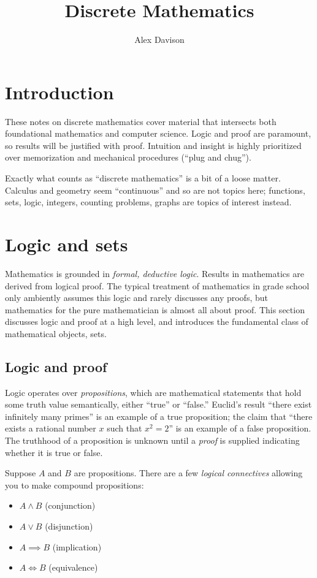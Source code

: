 \documentclass[11pt]{article}
\title{\textbf{Discrete Mathematics}}
\author{Alex Davison}
\theoremstyle{definition}
\theoremstyle{remark}
\begin{document}
\maketitle

\tableofcontents

\section{Introduction}

These notes on discrete mathematics cover material that intersects both foundational mathematics and computer science. Logic and proof are paramount, so results will be justified with proof. Intuition and insight is highly prioritized over memorization and mechanical procedures (``plug and chug'').

Exactly what counts as ``discrete mathematics'' is a bit of a loose matter. Calculus and geometry seem ``continuous'' and so are not topics here; functions, sets, logic, integers, counting problems, graphs are topics of interest instead.

\section{Logic and sets}

Mathematics is grounded in \emph{formal, deductive logic}. Results in mathematics are derived from logical proof. The typical treatment of mathematics in grade school only ambiently assumes this logic and rarely discusses any proofs, but mathematics for the pure mathematician is almost all about proof. This section discusses logic and proof at a high level, and introduces the fundamental class of mathematical objects, sets.

\subsection{Logic and proof}

Logic operates over \emph{propositions}, which are mathematical statements that hold some truth value semantically, either ``true'' or ``false.'' Euclid's result ``there exist infinitely many primes'' is an example of a true proposition; the claim that ``there exists a rational number $x$ such that $x^2 = 2$'' is an example of a false proposition. The truthhood of a proposition is unknown until a \emph{proof} is supplied indicating whether it is true or false.

Suppose $A$ and $B$ are propositions. There are a few \emph{logical connectives} allowing you to make compound propositions:
\begin{itemize}
    \item $A \wedge B$ (conjunction)
    \item $A \vee B$ (disjunction)
    \item $A \implies B$ (implication)
    \item $A \iff B$ (equivalence)
\end{itemize}
\end{document}
